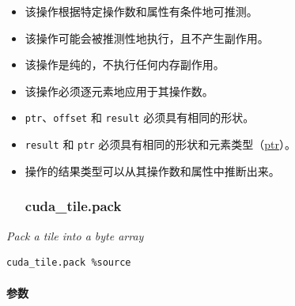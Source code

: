 \documentclass{article}
\begin{document}
\begin{itemize}
\item 该操作根据特定操作数和属性有条件地可推测。
\item 该操作可能会被推测性地执行，且不产生副作用。
\item 该操作是纯的，不执行任何内存副作用。
\item 该操作必须逐元素地应用于其操作数。
\item \texttt{ptr}、\texttt{offset} 和 \texttt{result} 必须具有相同的形状。
\item \texttt{result} 和 \texttt{ptr} 必须具有相同的形状和元素类型（\href{https://docs.nvidia.com/cuda/tile-ir/latest/sections/types.html#type-ptr}{ptr}）。
\item 操作的结果类型可以从其操作数和属性中推断出来。


\subsubsection{cuda\_tile.pack}

\end{itemize}
\textit{Pack a tile into a byte array}


\begin{lstlisting}
cuda_tile.pack %source
\end{lstlisting}

\paragraph{参数}
\end{document}
